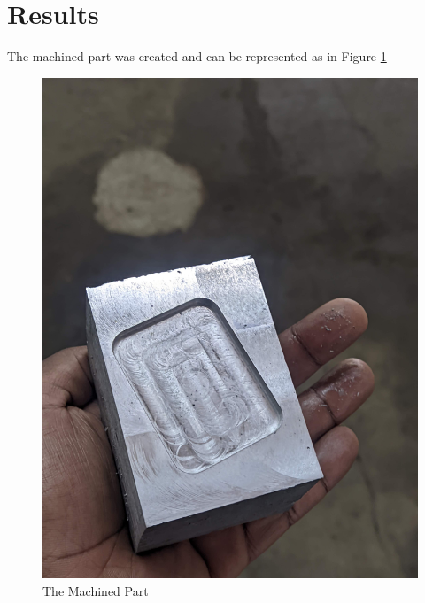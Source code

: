 \section{Results}
The machined part was created and can be represented as in Figure \ref{fig:result}
\begin{figure}
	\centering
	\includegraphics[width=0.75\linewidth]{Figures/result}
	\caption[Result]{The Machined Part}
	\label{fig:result}
\end{figure}